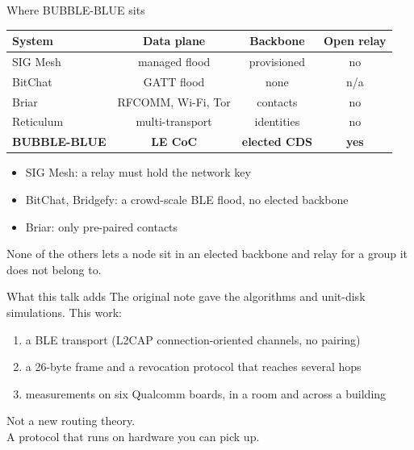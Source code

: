 \documentclass[aspectratio=169,11pt]{beamer}
\begin{document}
\begin{frame}{Where BUBBLE-BLUE sits}
{\small
\begin{tabular}{@{}lccc@{}}
\toprule
System & Data plane & Backbone & Open relay \\
\midrule
SIG Mesh & managed flood & provisioned & no \\
BitChat & GATT flood & none & n/a \\
Briar & RFCOMM, Wi-Fi, Tor & contacts & no \\
Reticulum & multi-transport & identities & no \\
\textbf{BUBBLE-BLUE} & \textbf{LE CoC} & \textbf{elected CDS} & \textbf{yes} \\
\bottomrule
\end{tabular}}
\vspace{6mm}
\begin{itemize}
  \item SIG Mesh: a relay must hold the network key
  \item BitChat, Bridgefy: a crowd-scale BLE flood, no elected backbone
  \item Briar: only pre-paired contacts
\end{itemize}
\vspace{3mm}
{\color{muted}\small None of the others lets a node sit in an elected backbone
and relay for a group it does not belong to.}
\end{frame}

\begin{frame}{What this talk adds}
The original note gave the algorithms and unit-disk simulations.
\vspace{4mm}
This work:
\begin{enumerate}
  \item a BLE transport (L2CAP connection-oriented channels, no pairing)
  \item a 26-byte frame and a revocation protocol that reaches several hops
  \item measurements on six Qualcomm boards, in a room and across a building
\end{enumerate}
\vspace{6mm}
Not a new routing theory.\\
A protocol that runs on hardware you can pick up.
\end{frame}
\end{document}
